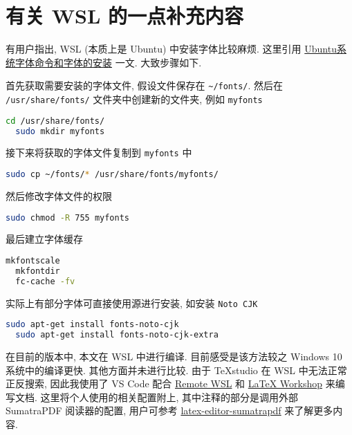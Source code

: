 
\chapter{有关 WSL 的一点补充内容}\label{chp:appendix:wsl}

有用户指出,
WSL (本质上是 Ubuntu) 中安装字体比较麻烦.
这里引用
\href{https://www.jianshu.com/p/e7f12b8c8602}{Ubuntu系统字体命令和字体的安装}
一文.
大致步骤如下.

首先获取需要安装的字体文件,
假设文件保存在 \verb|~/fonts/|.
然后在 \texttt{/usr/share/fonts/} 文件夹中创建新的文件夹,
例如 \texttt{myfonts}
\begin{lstlisting}[language=bash]
  cd /usr/share/fonts/
  sudo mkdir myfonts
\end{lstlisting}
接下来将获取的字体文件复制到 \texttt{myfonts} 中
\begin{lstlisting}[language=bash]
  sudo cp ~/fonts/* /usr/share/fonts/myfonts/ 
\end{lstlisting}
然后修改字体文件的权限
\begin{lstlisting}[language=bash]
  sudo chmod -R 755 myfonts
\end{lstlisting}
最后建立字体缓存
\begin{lstlisting}[language=bash]
  mkfontscale
  mkfontdir
  fc-cache -fv
\end{lstlisting}

实际上有部分字体可直接使用源进行安装,
如安装 \texttt{Noto CJK}
\begin{lstlisting}[language=bash]
  sudo apt-get install fonts-noto-cjk
  sudo apt-get install fonts-noto-cjk-extra
\end{lstlisting}

在目前的版本中, 本文在 WSL 中进行编译.
目前感受是该方法较之 Windows 10 系统中的编译更快.
其他方面并未进行比较.
由于 \TeX studio 在 WSL 中无法正常正反搜索,
因此我使用了 VS Code 配合
\href{https://marketplace.visualstudio.com/items?itemName=ms-vscode-remote.remote-wsl}{Remote WSL}
和
\href{https://marketplace.visualstudio.com/items?itemName=James-Yu.latex-workshop}{\LaTeX{} Workshop}
来编写文档.
这里将个人使用的相关配置附上,
其中注释的部分是调用外部 SumatraPDF 阅读器的配置,
用户可参考
\href{https://github.com/OsbertWang/latex-editor-sumatrapdf}{latex-editor-sumatrapdf}%
来了解更多内容.

